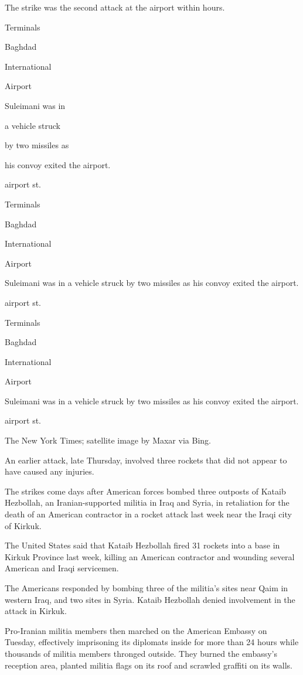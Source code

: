 The strike was the second attack at the airport within hours.

Terminals

Baghdad

International

Airport

Suleimani was in

a vehicle struck

by two missiles as

his convoy exited the airport.

airport st.

Terminals

Baghdad

International

Airport

Suleimani was in a vehicle struck by two missiles as his convoy exited
the airport.

airport st.

Terminals

Baghdad

International

Airport

Suleimani was in a vehicle struck by two missiles as his convoy exited
the airport.

airport st.

The New York Times; satellite image by Maxar via Bing.

An earlier attack, late Thursday, involved three rockets that did not
appear to have caused any injuries.

The strikes come days after American forces bombed three outposts of
Kataib Hezbollah, an Iranian-supported militia in Iraq and Syria, in
retaliation for the death of an American contractor in a rocket attack
last week near the Iraqi city of Kirkuk.

The United States said that Kataib Hezbollah fired 31 rockets into a
base in Kirkuk Province last week, killing an American contractor and
wounding several American and Iraqi servicemen.

The Americans responded by bombing three of the militia's sites near
Qaim in western Iraq, and two sites in Syria. Kataib Hezbollah denied
involvement in the attack in Kirkuk.

Pro-Iranian militia members then marched on the American Embassy on
Tuesday, effectively imprisoning its diplomats inside for more than 24
hours while thousands of militia members thronged outside. They burned
the embassy's reception area, planted militia flags on its roof and
scrawled graffiti on its walls.

